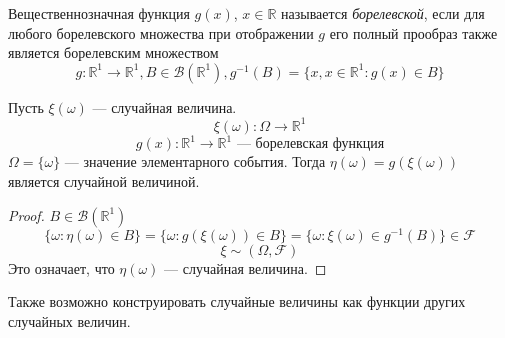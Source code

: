 \begin{definition}
	Вещественнозначная функция $g(x)$, $x \in \mathbb{R}$ называется \textit{борелевской}, если для любого борелевского множества при отображении $g$ его полный прообраз также является борелевским множеством
	\[
		g : \mathbb{R}^1 \rightarrow \mathbb{R}^1, B \in \mathcal{B} (\mathbb{R}^1), g^{-1} (B) = \{ x, x \in \mathbb{R}^1 : g(x) \in B \}
	\]
\end{definition}
\begin{theorem}
	Пусть $\xi (\omega)$ --- случайная величина.
	\[
		\xi (\omega) : \Omega \rightarrow \mathbb{R}^1
	\]
	\[
		g(x) : \mathbb{R}^1 \rightarrow \mathbb{R}^1 \text{ --- борелевская функция}
	\]
	$\Omega = \{ \omega \}$ --- значение элементарного события. Тогда $\eta (\omega) = g (\xi (\omega))$ является случайной величиной.
\end{theorem}
\begin{proof}
	$B \in \mathcal{B} (\mathbb{R}^1)$
	\[
			\{ \omega : \eta (\omega) \in B \} = \{ \omega : g(\xi(\omega)) \in B \} = \{ \omega : \xi(\omega) \in g^{-1} (B) \} \in \mathcal {F}
	\]
	\[
		\xi \sim (\Omega, \mathcal{F})
	\]
	Это означает, что $\eta(\omega)$ --- случайная величина.
\end{proof}
Также возможно конструировать случайные величины как функции других случайных величин.
